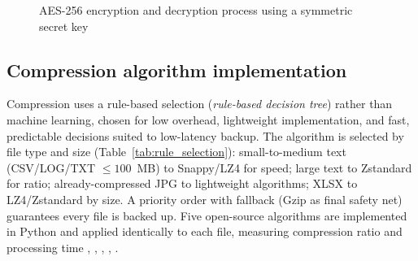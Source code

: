 \documentclass{iaesarticle}
\begin{document}
\begin{figure}[htbp]
\centering
{}
\vspace{.5em}
\caption{AES-256 encryption and decryption process using a symmetric secret key}
\label{fig:aes}
\end{figure}

\subsection{Compression algorithm implementation}
Compression uses a rule-based selection (\textit{rule-based decision tree}) rather than machine learning, chosen for low overhead, lightweight implementation, and fast, predictable decisions suited to low-latency backup. The algorithm is selected by file type and size (Table~\ref{tab:rule_selection}): small-to-medium text (CSV/LOG/TXT $\leq 100$~MB) to Snappy/LZ4 for speed; large text to Zstandard for ratio; already-compressed JPG to lightweight algorithms; XLSX to LZ4/Zstandard by size. A priority order with fallback (Gzip as final safety net) guarantees every file is backed up. Five open-source algorithms are implemented in Python and applied identically to each file, measuring compression ratio and processing time \cite{36}, \cite{37}, \cite{38}, \cite{39}, \cite{22}.
\end{document}
